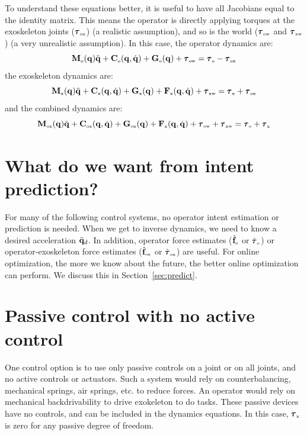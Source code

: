 \documentclass[letterpaper,12pt,fullpage]{article}
\newcommand{\myo}{{\mbox {\tiny o}}}
\newcommand{\myx}{{\mbox {\tiny x}}}
\newcommand{\ox}{{\mbox {\tiny ox}}}
\newcommand{\ow}{{\mbox {\tiny ow}}}
\newcommand{\xw}{{\mbox {\tiny xw}}}
\begin{document}
To understand these equations better, it is useful to have all Jacobians equal
to the identity matrix. This means the operator is directly applying torques
at the exoskeleton joints ($\vtau_{\ox}$) (a realistic assumption), 
and so is the world ($\vtau_{\ow}$ and $\vtau_{\xw}$)
(a very unrealistic assumption). In this case,
the operator dynamics are:
\begin{equation}
\mM_{\myo}(\vq) \ddot{\vq} + \mC_{\myo}(\vq,\dot{\vq}) + \mG_{\myo}(\vq)
+ \vtau_{\ow} = \vtau_{\myo} - \vtau_{\ox}
\end{equation}
the exoskeleton dynamics are:
\begin{equation}
\mM_{\myx}(\vq) \ddot{\vq} + \mC_{\myx}(\vq,\dot{\vq}) + \mG_{\myx}(\vq)
+ \mF_{\myx}(\vq,\dot{\vq})
+ \vtau_{\xw} = \vtau_{\myx} + \vtau_{\ox}
\end{equation}
and the combined dynamics are:
\begin{equation}
\mM_{\ox}(\vq) \ddot{\vq} + \mC_{\ox}(\vq,\dot{\vq}) + \mG_{\ox}(\vq)
+ \mF_{\myx}(\vq,\dot{\vq})
+ \vtau_{\ow}
+ \vtau_{\xw} 
= \vtau_{\myo} + \vtau_{\myx}
\label{eq:oxdynamics}
\end{equation}

\section{What do we want from intent prediction?}

For many of the following control systems, no operator intent estimation or
prediction is needed.
When we get to inverse dynamics, we need to know a desired acceleration
$\ddot{{\bf q}}_d$.
In addition,
operator force 
estimates ($\hat{\vf}_{\myo}$ or $\hat{\vtau}_{\myo}$) or
operator-exoskeleton force 
estimates ($\hat{\vf}_{\ox}$ or $\hat{\vtau}_{\ox}$) are useful.
For online optimization, the more we know about the future, the better online
optimization can perform. We discuss this in Section~\ref{sec:predict}.

\section{Passive control with no active control}

One control option is to use only passive controls on a joint or on
all joints, and no active controls
or actuators.
Such a system would rely on counterbalancing, mechanical springs, air springs, etc.
to reduce forces. 
An operator would rely on mechanical backdrivability to drive
exokeleton to do tasks.
These passive devices have no controls, and can be included in the dynamics equations.
In this case, 
$\vtau_{\myx}$ is zero for any passive degree of freedom.
\end{document}
